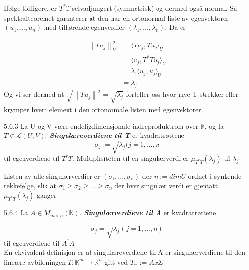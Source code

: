 \documentclass[a4paper,norsk]{article}
\renewcommand{\geq}{\geqslant}
\begin{document}
Ifølge tidligere, er $ T^*T $ selvadjungert (symmetrisk) og dermed også normal. Så spektralteoremet garanterer at den har en ortonormal liste av egenvektorer $ \left( u_1, ..., u_n \right)  $ med tilhørende egenverdier $ \left( \lambda _1, ..., \lambda _n \right)  $. Da er 

\begin{align*}
    \left\lVert Tu_j \right\rVert ^2_V &= \langle Tu_j, Tu_j \rangle_{ U } \\
    &= \langle u_j, T^*Tu_j \rangle_{ U } \\
    &= \lambda _j \langle u_j, u_j \rangle_{ U } \\
    &= \lambda _j
\end{align*}
Og vi ser dermed at $ \sqrt{ \left\lVert Tu_j \right\rVert ^2 } = \sqrt{ \lambda _j } $ forteller oss hvor mye T strekker eller krymper hvert element i den ortonormale listen med egenvektorer.

\begin{definitionbox}{5.6.3}{}
La U og V være endeligdimensjonale indreproduktrom over $ \mathbb{K} $, og la $ T \in \mathcal{L}(U, V) $. \textbf{\textit{Singulæreverdiene til T}} er kvadratrøttene 
\[
    \sigma_j := \sqrt{ \lambda _j } (j=1, ..., n
\]
til egenverdiene til $ T^*T $. Multiplisiteten til en singulærverdi er $ \mu_{T^*T}(\lambda _j) $  til $ \lambda _j $


Listen av alle singulærverdier er $ \left( \sigma_1, ..., \sigma_n \right)  $ der $ n := dimU $ ordnet i synkende rekkefølge, slik at $ \sigma_1 \geq \sigma_2 \geq ... \geq \sigma_n $ der hver singulær verdi er gjentatt $ \mu_{T^*T}(\lambda _j )$ ganger 
\end{definitionbox}


\begin{definitionbox}{5.6.4}{}
La $ A \in M_{m \times n} (\mathbb{K}) $. \textbf{\textit{Singulærverdiene til A}}  er kvadratrøttene 

\[
    \sigma_j = \sqrt{ \lambda _j } \left( j=1, ..., n \right) 
\]
til egenverdiene til $ A^*A $ \\

En ekvivalent definisjon er at singulæreverdiene til A er singulærverdiene til den lineære avbildningen $ T: \mathbb{K}^m \rightarrow \mathbb{K}^n $ gitt ved $ Tx := Ax\Sigma  $ 
\end{definitionbox}
\end{document}
